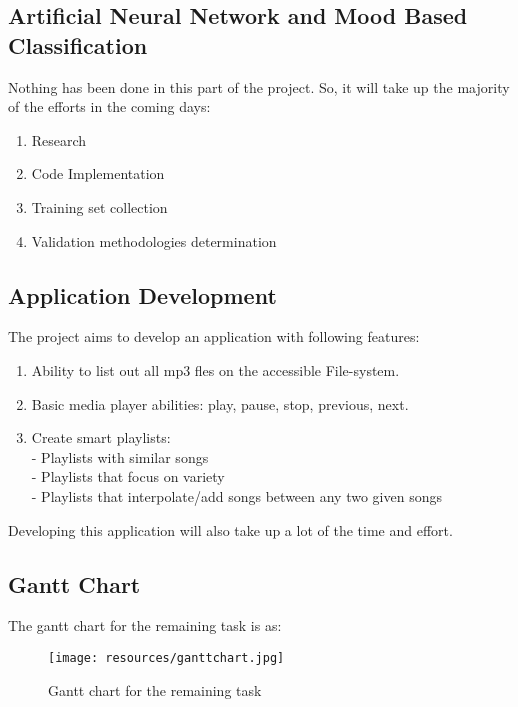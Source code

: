                     \subsection{Artificial Neural Network and Mood Based Classification}
                     Nothing has been done in this part of the project. So, it will take up the majority of the efforts in the coming days:
                     \begin{enumerate}
                             \item Research
                             \item Code Implementation
                             \item Training set collection
                             \item Validation methodologies determination
                     \end{enumerate}

                     \subsection{Application Development}
                     The project aims to develop an application with following features:
                     \begin{enumerate}
                             \item Ability to list out all mp3 fles on the accessible File-system. 
                             \item Basic media player abilities: play, pause, stop, previous, next. 
                             \item Create smart playlists: \\
                                      - Playlists with similar songs\\ 
                                      - Playlists that focus on variety \\
                                      - Playlists that interpolate/add songs between any two given songs
                     \end{enumerate}
                     Developing this application will also take up a lot of the time and effort.
                     \newpage
                     \subsection{Gantt Chart}
                     The gantt chart for the remaining task is as:
                     \begin{figure}[h]
                             \centering
                             \texttt{[image: resources/ganttchart.jpg]}
                             \caption{Gantt chart for the remaining task}
                             \label{fig:figure 11}
                     \end{figure}
